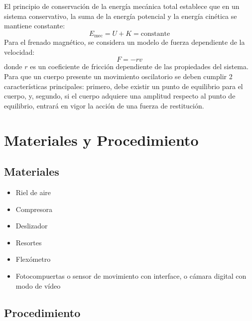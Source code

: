 \documentclass{article}
\begin{document}
\newpage
El principio de conservación de la energía mecánica total establece que en un sistema conservativo, la suma de la energía potencial y la energía cinética se mantiene constante:
\[
E_{\text{mec}} = U + K = \text{constante}
\]
Para el frenado magnético, se considera un modelo de fuerza dependiente de la velocidad:
\[
F = -rv
\]
donde \( r \) es un coeficiente de fricción dependiente de las propiedades del sistema. 
\\
Para que un cuerpo presente un movimiento oscilatorio se deben cumplir 2 características principales: primero, debe existir un punto de equilibrio para el cuerpo, y, segundo, si el cuerpo adquiere una amplitud respecto al punto de equilibrio, entrará en vigor la acción de una fuerza de restitución.

\section{Materiales y Procedimiento}
\subsection{Materiales}
\begin{itemize}
    \item Riel de aire
    \item Compresora
    \item Deslizador
    \item Resortes
    \item Flexómetro
    \item Fotocompuertas o sensor de movimiento con interface, o cámara digital con modo de vídeo
\end{itemize}

\subsection{Procedimiento}
\end{document}

